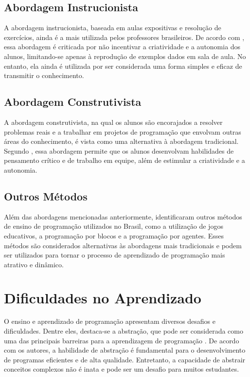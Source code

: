 \subsection{Abordagem Instrucionista}

A abordagem instrucionista, baseada em aulas expositivas e resolução de exercícios, ainda é a mais utilizada pelos professores brasileiros. De acordo com \cite{Silva2018}, essa abordagem é criticada por não incentivar a criatividade e a autonomia dos alunos, limitando-se apenas à reprodução de exemplos dados em sala de aula. No entanto, ela ainda é utilizada por ser considerada uma forma simples e eficaz de transmitir o conhecimento.

\subsection{Abordagem Construtivista}

A abordagem construtivista, na qual os alunos são encorajados a resolver problemas reais e a trabalhar em projetos de programação que envolvam outras áreas do conhecimento, é vista como uma alternativa à abordagem tradicional. Segundo \cite{Silva2018}, essa abordagem permite que os alunos desenvolvam habilidades de pensamento crítico e de trabalho em equipe, além de estimular a criatividade e a autonomia.

\subsection{Outros Métodos}

Além das abordagens mencionadas anteriormente, \cite{Silva2018} identificaram outros métodos de ensino de programação utilizados no Brasil, como a utilização de jogos educativos, a programação por blocos e a programação por agentes. Esses métodos são considerados alternativas às abordagens mais tradicionais e podem ser utilizados para tornar o processo de aprendizado de programação mais atrativo e dinâmico.


\section{Dificuldades no Aprendizado}

O ensino e aprendizado de programação apresentam diversos desafios e dificuldades. Dentre eles, destaca-se a abstração, que pode ser considerada como uma das principais barreiras para a aprendizagem de programação \cite{Silva2014}. De acordo com os autores, a habilidade de abstração é fundamental para o desenvolvimento de programas eficientes e de alta qualidade. Entretanto, a capacidade de abstrair conceitos complexos não é inata e pode ser um desafio para muitos estudantes.


